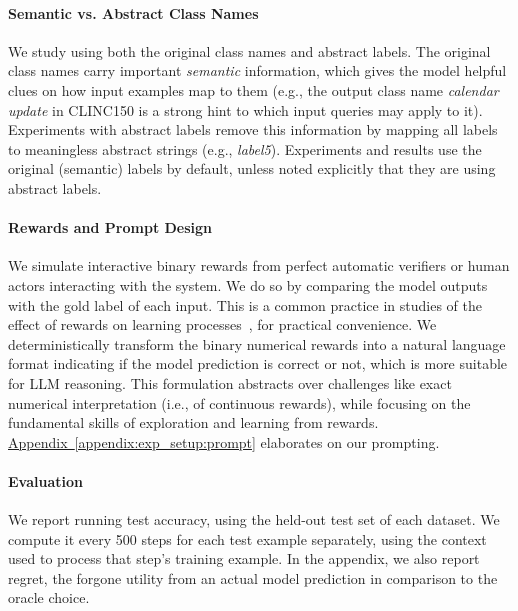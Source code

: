 \documentclass{article}
\theoremstyle{plain}
\theoremstyle{definition}
\theoremstyle{remark}
\newcommand{\aautoref}[1]{\hyperref[#1]{Appendix~\ref*{#1}}}
\newcommand{\clinic}{CLINC150\xspace}
\begin{document}
\paragraph{Semantic vs. Abstract Class Names}
We study using both the original class names and abstract labels.
The original class names carry important \emph{semantic} information, which gives the model helpful clues on how input examples map to them (e.g., the output class name \textit{calendar update} in \clinic is a strong hint to which input queries may apply to it).
Experiments with abstract labels remove this information by mapping all labels to meaningless abstract strings (e.g., \textit{label5}).
Experiments and results use the original (semantic) labels by default, unless noted explicitly that they are using abstract labels.
\paragraph{Rewards and Prompt Design}
We simulate interactive binary rewards from perfect automatic verifiers or human actors interacting with the system. We do so by comparing the model outputs with the gold label of each input. This is a common practice in studies of the effect of rewards on learning processes~\citep{10.5555/3618408.3618845,lightman2024lets}, for practical convenience. We deterministically transform the binary numerical rewards into a natural language format indicating if the model prediction is correct or not, which is more suitable for LLM reasoning.
This formulation abstracts over challenges like exact numerical interpretation (i.e., of continuous rewards), while focusing on the fundamental skills of exploration and learning from rewards.
\aautoref{appendix:exp_setup:prompt} elaborates on our prompting.
\paragraph{Evaluation}
We report running test accuracy, using the held-out test set of each dataset. We compute it every 500 steps for each test example separately, using the context used to process that step's training example. In the appendix, we also report regret, the forgone utility from an actual model prediction in comparison to the oracle choice.
\end{document}
